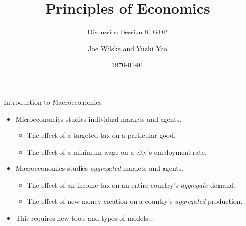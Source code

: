 \documentclass[9pt]{beamer}
\title{Principles of Economics}
\subtitle{Discussion Session 8: GDP}
\author{Joe Wilske and Yuzhi Yao}
\institute{Boston College}
\date{\today}
\begin{document}
\frame{\titlepage}

\begin{frame}{Introduction to Macroeconomics}
        \begin{itemize}
        \item Microeconomics studies individual markets and agents.
        \vspace{5pt}
        \begin{itemize}
            \item The effect of a targeted tax on a particular good.
            \vspace{3pt}
            \item The effect of a minimum wage on a city's employment rate.
        \end{itemize}
        \vspace{5pt}
        \item Macroeconomics studies \textit{aggregated} markets and agents.
        \vspace{5pt}
        \begin{itemize}
            \item The effect of an income tax on an entire country's \textit{aggregate} demand.
            \vspace{3pt}
            \item The effect of new money creation on a country's \textit{aggregated} production.
        \end{itemize}
        \vspace{10pt}
        \item This requires new tools and types of models...
    \end{itemize}    
\end{frame}
\end{document}

